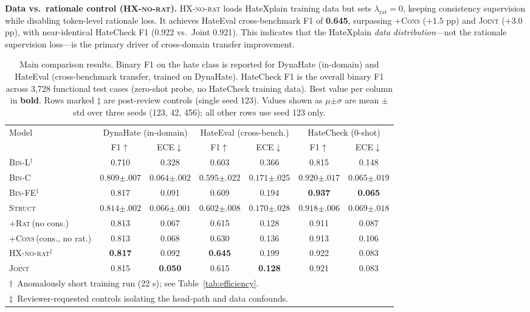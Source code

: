\documentclass{article}
\begin{document}
\textbf{Data vs.\ rationale control (\textsc{HX-no-rat}).}
\textsc{HX-no-rat} loads HateXplain training data but sets $\lambda_\text{rat}=0$,
keeping consistency supervision while disabling token-level rationale loss.
It achieves HateEval cross-benchmark F1 of \textbf{0.645}, surpassing
\textsc{+Cons} ($+1.5$ pp) and \textsc{Joint} ($+3.0$ pp), with near-identical
HateCheck F1 (0.922 vs.\ Joint 0.921).
This indicates that the HateXplain \emph{data distribution}—not the rationale
supervision loss—is the primary driver of cross-domain transfer improvement.

\begin{table}[t]
\centering
\caption{Main comparison results.
Binary F1 on the hate class is reported for DynaHate (in-domain) and HateEval
(cross-benchmark transfer, trained on DynaHate).
HateCheck F1 is the overall binary F1 across 3,728 functional test cases
(zero-shot probe, no HateCheck training data).
Best value per column in \textbf{bold}.
Rows marked $\ddagger$ are post-review controls (single seed 123).
Values shown as $\mu{\scriptstyle\pm\sigma}$ are mean $\pm$ std over three seeds (123, 42, 456);
all other rows use seed 123 only.}
\label{tab:main}
\small
\setlength{\tabcolsep}{5pt}
\begin{tabular}{lcccccc}
\toprule
\multirow{2}{*}{Model} & \multicolumn{2}{c}{DynaHate (in-domain)} & \multicolumn{2}{c}{HateEval (cross-bench.)} & \multicolumn{2}{c}{HateCheck (0-shot)} \\
\cmidrule(lr){2-3}\cmidrule(lr){4-5}\cmidrule(lr){6-7}
 & F1$\uparrow$ & ECE$\downarrow$ & F1$\uparrow$ & ECE$\downarrow$ & F1$\uparrow$ & ECE$\downarrow$ \\
\midrule
\textsc{Bin-L}$^\dagger$ & 0.710 & 0.328 & 0.603 & 0.366 & 0.815 & 0.148 \\
\textsc{Bin-C} & $0.809{\scriptstyle\pm.007}$ & $0.064{\scriptstyle\pm.002}$ & $0.595{\scriptstyle\pm.022}$ & $0.171{\scriptstyle\pm.025}$ & $0.920{\scriptstyle\pm.017}$ & $0.065{\scriptstyle\pm.019}$ \\
\midrule
\textsc{Bin-FE}$^\ddagger$ & 0.817 & 0.091 & 0.609 & 0.194 & \textbf{0.937} & \textbf{0.065} \\
\textsc{Struct} & $0.814{\scriptstyle\pm.002}$ & $0.066{\scriptstyle\pm.001}$ & $0.602{\scriptstyle\pm.008}$ & $0.170{\scriptstyle\pm.028}$ & $0.918{\scriptstyle\pm.006}$ & $0.069{\scriptstyle\pm.018}$ \\
\textsc{+Rat}\,(no cons.) & 0.813 & 0.067 & 0.615 & 0.128 & 0.911 & 0.087 \\
\textsc{+Cons}\,(cons., no rat.) & 0.813 & 0.068 & 0.630 & 0.136 & 0.913 & 0.106 \\
\textsc{HX-no-rat}$^\ddagger$ & \textbf{0.817} & 0.092 & \textbf{0.645} & 0.199 & 0.922 & 0.083 \\
\textsc{Joint} & 0.815 & \textbf{0.050} & 0.615 & \textbf{0.128} & 0.921 & 0.083 \\
\bottomrule
\multicolumn{7}{l}{\small$\dagger$~Anomalously short training run (22 s); see Table~\ref{tab:efficiency}.} \\
\multicolumn{7}{l}{\small$\ddagger$~Reviewer-requested controls isolating the head-path and data confounds.}
\end{tabular}
\end{table}
\end{document}
